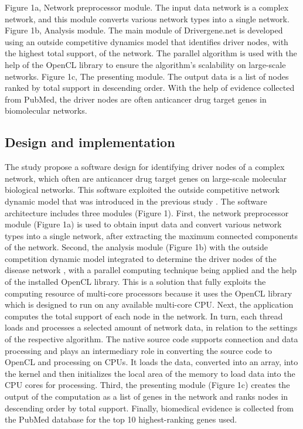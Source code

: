 \documentclass[5p,,preprint,12pt]{elsarticle}
\begin{document}
Figure 1a, Network preprocessor module. The input data network is a complex network, and this module converts various network types into a single network. Figure 1b,  Analysis module. The main module of Drivergene.net is developed using an outside competitive dynamics model that identifies driver nodes, with the highest total support, of the network. The parallel algorithm is used with the help of the OpenCL library to ensure the algorithm's scalability on large-scale networks. Figure 1c, The presenting module. The output data is a list of nodes ranked by total support in descending order. With the help of evidence collected from PubMed, the driver nodes are often anticancer drug target genes in biomolecular networks.

\subsection{Design and implementation}
The study propose a software design for identifying driver nodes of a complex network, which often are anticancer drug target genes on large-scale molecular biological networks. This software exploited the outside competitive network dynamic model that was introduced in the previous study \cite{5}. The software architecture includes three modules (Figure 1). First, the network preprocessor module (Figure 1a) is used to obtain input data and convert various network types into a single network, after extracting the maximum connected components of the network. Second, the analysis module (Figure 1b) with the outside competition dynamic model \cite{5} integrated to determine the driver nodes of the disease network \cite{23}, with a parallel computing technique being applied and the help of the installed OpenCL library. This is a solution that fully exploits the computing resource of multi-core processors because it uses the OpenCL library which is designed to run on any available multi-core CPU. Next, the application computes the total support of each node in the network. In turn, each thread loads and processes a selected amount of network data, in relation to the settings of the respective algorithm. The native source code supports connection and data processing and plays an intermediary role in converting the source code to OpenCL and processing on CPUs. It loads the data, converted into an array, into the kernel and then initializes the local area of the memory to load data into the CPU cores for processing. Third, the presenting module (Figure 1c) creates the output of the computation as a list of genes in the network and ranks nodes in descending order by total support. Finally, biomedical evidence is collected from the PubMed database for the top 10 highest-ranking genes used.
\end{document}
